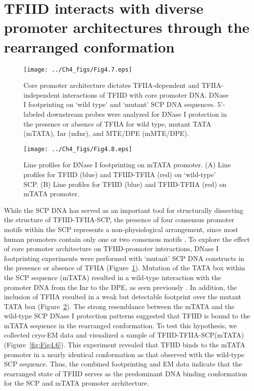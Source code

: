\section{TFIID interacts with diverse promoter architectures through the rearranged conformation}
\begin{figure}
\centering
\texttt{[image: ../Ch4\_figs/Fig4.7.eps]}
\caption[Core promoter architecture dictates TFIIA-dependent and TFIIA-independent interactions of TFIID with core promoter DNA]{Core promoter architecture dictates TFIIA-dependent and TFIIA-independent interactions of TFIID with core promoter DNA. DNase I footprinting on ‘wild type’ and ‘mutant’ SCP DNA sequences. 5'-labeled downstream probes were analyzed for DNase I protection in the presence or absence of TFIIA for wild type, mutant TATA (mTATA), Inr (mInr), and MTE/DPE (mMTE/DPE).}
\label{fig:Fig4.7}
\end{figure}
\begin{figure}
\centering
\texttt{[image: ../Ch4\_figs/Fig4.8.eps]}
\caption[Line profiles for DNase I footprinting on mTATA promoter]{Line profiles for DNase I footprinting on mTATA promoter.  (A) Line profiles for TFIID (blue) and TFIID-TFIIA (red) on ‘wild-type’ SCP.  (B) Line profiles for TFIID (blue) and TFIID-TFIIA (red) on mTATA promoter.}
\label{fig:Fig4.8}
\end{figure}
While the SCP DNA has served as an important tool for structurally dissecting the structure of TFIID-TFIIA-SCP, the presence of four consensus promoter motifs within the SCP represents a non-physiological arrangement, since most human promoters contain only one or two consensus motifs \cite{Juven-Gershon_468}. To explore the effect of core promoter architecture on TFIID-promoter interactions, DNase I footprinting experiments were performed with ‘mutant’ SCP DNA constructs in the presence or absence of TFIIA (Figure~\ref{fig:Fig4.7}). Mutation of the TATA box within the SCP sequence (mTATA) resulted in a wild-type interaction with the promoter DNA from the Inr to the DPE, as seen previously \cite{Juven-Gershon_1249}. In addition, the inclusion of TFIIA resulted in a weak but detectable footprint over the mutant TATA box (Figure~\ref{fig:Fig4.8}). The strong resemblance between the mTATA and the wild-type SCP DNase I protection patterns suggested that TFIID is bound to the mTATA sequence in the rearranged conformation. To test this hypothesis, we collected cryo-EM data and visualized a sample of TFIID-TFIIA-SCP(mTATA) (Figure~\ref{fig:Fig4.6}). This experiment revealed that TFIID binds to the mTATA promoter in a nearly identical conformation as that observed with the wild-type SCP sequence. Thus, the combined footprinting and EM data indicate that the rearranged state of TFIID serves as the predominant DNA binding conformation for the SCP and mTATA promoter architecture.\\
